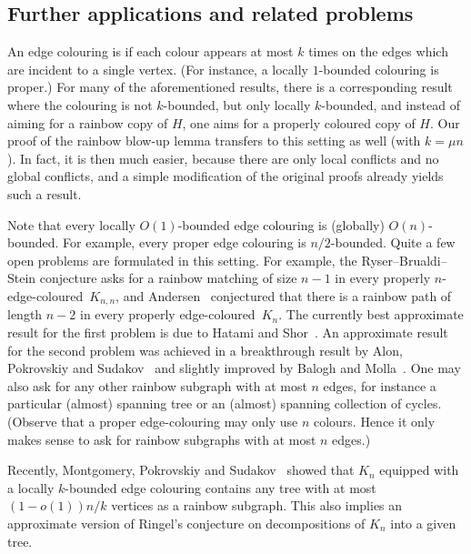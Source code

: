 \documentclass[10pt]{amsart}
\theoremstyle{definition}
\theoremstyle{claimstyle}
\theoremstyle{stepstyle}
\numberwithin{equation}{section}
\begin{document}
\subsection{Further applications and related problems} \label{subsec:related stuff}

An edge colouring is  if each colour appears at most $k$ times on the edges which are incident to a single vertex. (For instance, a locally $1$-bounded colouring is proper.) For many of the aforementioned results, there is a corresponding result where the colouring is not $k$-bounded, but only locally $k$-bounded, and instead of aiming for a rainbow copy of $H$, one aims for a properly coloured copy of $H$. Our proof of the rainbow blow-up lemma transfers to this setting as well (with $k=\mu n$). In fact, it is then much easier, because there are only local conflicts and no global conflicts,
and a simple modification of the original proofs already yields such a result.

Note that every locally $O(1)$-bounded edge colouring is (globally) $O(n)$-bounded. For example, every proper edge colouring is $n/2$-bounded. 
Quite a few open problems are formulated in this setting. 
For example, the Ryser--Brualdi--Stein conjecture asks for a rainbow matching of size $n-1$ in every properly $n$-edge-coloured~$K_{n,n}$, and Andersen~\cite{andersen:89} conjectured that there is a rainbow path of length $n-2$ in every properly edge-coloured~$K_n$.
The currently best approximate result for the first problem is due to Hatami and Shor~\cite{HS:08}. 
An approximate result for the second problem was achieved in a breakthrough result by Alon, Pokrovskiy and Sudakov~\cite{APS:17} and slightly improved by Balogh and Molla~\cite{BM:17}. One may also ask for any other rainbow subgraph with at most $n$ edges, for instance a particular (almost) spanning tree or an (almost) spanning collection of cycles. (Observe that a proper edge-colouring may only use $n$ colours.
Hence it only makes sense to ask for rainbow subgraphs with at most $n$ edges.) 

Recently, Montgomery, Pokrovskiy and Sudakov~\cite{MPS:18a} showed that $K_n$ equipped with a locally $k$-bounded edge colouring
contains any tree with at most $(1-o(1))n/k$ vertices as a rainbow subgraph.
This also implies an approximate version of Ringel's conjecture on decompositions of $K_n$ into a given tree.
\end{document}

